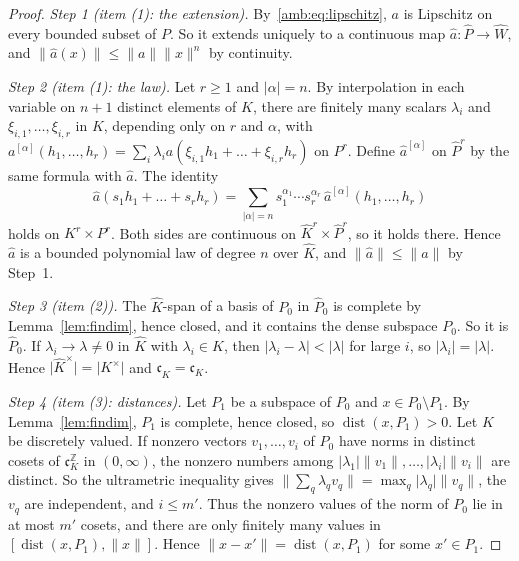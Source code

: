\documentclass[11pt]{amsart}
\theoremstyle{definition}
\theoremstyle{remark}
\numberwithin{equation}{section}
\newcommand{\Z}{\mathbb Z}
\newcommand{\abs}[1]{\lvert #1\rvert}
\newcommand{\norm}[1]{\lVert #1\rVert}
\newcommand{\Kh}{\widehat K}
\theoremstyle{plain}
\theoremstyle{definition}
\theoremstyle{plain}
\begin{document}
\begin{proof}
\emph{Step 1 (item (1): the extension).} By~\eqref{amb:eq:lipschitz}, $a$ is Lipschitz on every bounded subset of $P$. So
it extends uniquely to a continuous map $\hat a\colon\widehat P\to\widehat W$, and $\norm{\hat a(x)}\le\norm a\norm x^n$ by
continuity.

\emph{Step 2 (item (1): the law).} Let $r\ge1$ and $\abs\alpha=n$. By interpolation in each variable on $n+1$ distinct
elements of $K$, there are finitely many scalars $\lambda_i$ and $\xi_{i,1},\dots,\xi_{i,r}$ in $K$, depending only on $r$
and $\alpha$, with $a^{[\alpha]}(h_1,\dots,h_r)=\sum_i\lambda_ia(\xi_{i,1}h_1+\dots+\xi_{i,r}h_r)$ on $P^r$. Define
$\hat a^{[\alpha]}$ on $\widehat P^r$ by the same formula with $\hat a$. The identity
\[
 \hat a(s_1h_1+\dots+s_rh_r)=\sum_{\abs\alpha=n}s_1^{\alpha_1}\cdots s_r^{\alpha_r}\,\hat a^{[\alpha]}(h_1,\dots,h_r)
\]
holds on $K^r\times P^r$. Both sides are continuous on $\Kh^r\times\widehat P^r$, so it holds there. Hence $\hat a$ is a bounded polynomial law of degree $n$ over $\Kh$, and $\norm{\hat a}\le\norm a$ by Step~1.

\emph{Step 3 (item (2)).} The $\Kh$\nobreakdash-span of a basis of $P_0$ in $\widehat P_0$ is complete by
Lemma~\ref{lem:findim}, hence closed, and it contains the dense subspace $P_0$. So it is $\widehat P_0$. If
$\lambda_i\to\lambda\ne0$ in $\Kh$ with $\lambda_i\in K$, then $\abs{\lambda_i-\lambda}<\abs\lambda$ for large $i$, so
$\abs{\lambda_i}=\abs\lambda$. Hence $\abs{\Kh^\times}=\abs{K^\times}$ and $\mathfrak c_{\Kh}=\mathfrak c_K$.

\emph{Step 4 (item (3): distances).} Let $P_1$ be a subspace of $P_0$ and $x\in P_0\setminus P_1$. By
Lemma~\ref{lem:findim}, $P_1$ is complete, hence closed, so $\operatorname{dist}(x,P_1)>0$. Let $K$ be discretely valued.
If nonzero vectors $v_1,\dots,v_i$ of $P_0$ have norms in distinct cosets of $\mathfrak c_K^{\Z}$ in $(0,\infty)$, the
nonzero numbers among $\abs{\lambda_1}\norm{v_1},\dots,\abs{\lambda_i}\norm{v_i}$ are distinct. So the ultrametric
inequality gives $\norm{\sum_q\lambda_qv_q}=\max_q\abs{\lambda_q}\norm{v_q}$, the $v_q$ are independent, and $i\le m'$.
Thus the nonzero values of the norm of $P_0$ lie in at most $m'$ cosets, and there are only finitely many values in
$[\operatorname{dist}(x,P_1),\norm x]$. Hence $\norm{x-x'}=\operatorname{dist}(x,P_1)$ for some $x'\in P_1$.


\end{proof}
\end{document}

